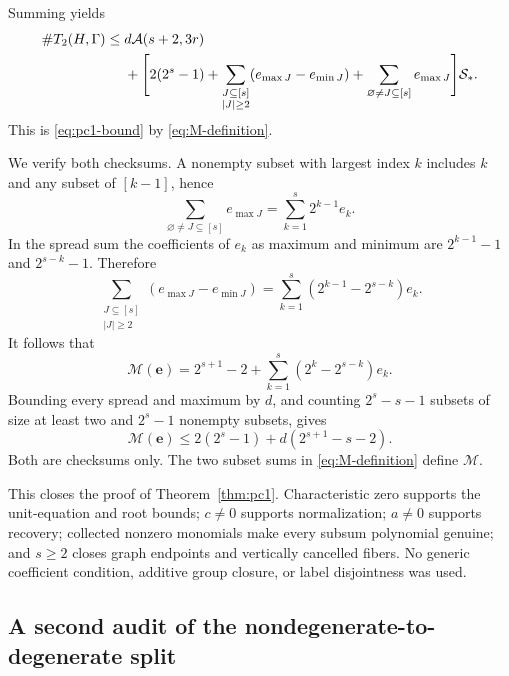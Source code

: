 \documentclass[11pt]{article}
\theoremstyle{definition}
\newcommand{\Acal}{\mathcal A}
\newcommand{\Scal}{\mathcal S}
\newcommand{\Mcal}{\mathcal M}
\newcommand{\ee}{\mathbf e}
\newcommand{\card}{\#}
\begin{document}
Summing yields
\begin{align}
 \card T_2(H,\Gamma)\leq{}&d\Acal(s+2,3r)\notag\\
 &+\Bigg[2(2^s-1)
 +\sum_{\substack{J\subseteq[s]\\|J|\geq2}}
 (e_{\max J}-e_{\min J})
 +\sum_{\varnothing\neq J\subseteq[s]}e_{\max J}\Bigg]\Scal_*.
 \label{eq:pc1-sum}
\end{align}
This is \eqref{eq:pc1-bound} by \eqref{eq:M-definition}.

We verify both checksums. A nonempty subset with largest index \(k\) includes \(k\) and any subset of \([k-1]\), hence
\begin{equation}
 \sum_{\varnothing\neq J\subseteq[s]}e_{\max J}
 =\sum_{k=1}^{s}2^{k-1}e_k.
 \label{eq:max-sum}
\end{equation}
In the spread sum the coefficients of \(e_k\) as maximum and minimum are \(2^{k-1}-1\) and \(2^{s-k}-1\). Therefore
\begin{equation}
 \sum_{\substack{J\subseteq[s]\\|J|\geq2}}
 (e_{\max J}-e_{\min J})
 =\sum_{k=1}^{s}(2^{k-1}-2^{s-k})e_k.
 \label{eq:spread-sum}
\end{equation}
It follows that
\begin{equation}
 \Mcal(\ee)=2^{s+1}-2+\sum_{k=1}^{s}(2^k-2^{s-k})e_k.
 \label{eq:M-closed}
\end{equation}
Bounding every spread and maximum by \(d\), and counting \(2^s-s-1\) subsets of size at least two and \(2^s-1\) nonempty subsets, gives
\begin{equation}
 \Mcal(\ee)\leq2(2^s-1)+d(2^{s+1}-s-2).
 \label{eq:M-crude}
\end{equation}
Both are checksums only. The two subset sums in \eqref{eq:M-definition} define \(\Mcal\).

This closes the proof of Theorem~\ref{thm:pc1}. Characteristic zero supports the unit-equation and root bounds; \(c\neq0\) supports normalization; \(a\neq0\) supports recovery; collected nonzero monomials make every subsum polynomial genuine; and \(s\geq2\) closes graph endpoints and vertically cancelled fibers. No generic coefficient condition, additive group closure, or label disjointness was used.


\subsection{A second audit of the nondegenerate-to-degenerate split}
\end{document}
